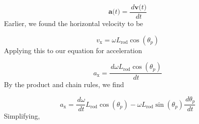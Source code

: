 \documentclass[12pt]{article}
\begin{document}
\begin{displaymath}
\symbf{a}\text{(}t\text{)}=\frac{\,d\symbf{v}\text{(}t\text{)}}{\,dt}
\end{displaymath}
Earlier, we found the horizontal velocity to be

\begin{displaymath}
{v_{\text{x}}}=ω {L_{\text{rod}}} \cos\left({θ_{p}}\right)
\end{displaymath}
Applying this to our equation for acceleration

\begin{displaymath}
{a_{\text{x}}}=\frac{\,dω {L_{\text{rod}}} \cos\left({θ_{p}}\right)}{\,dt}
\end{displaymath}
By the product and chain rules, we find

\begin{displaymath}
{a_{\text{x}}}=\frac{\,dω}{\,dt} {L_{\text{rod}}} \cos\left({θ_{p}}\right)-ω {L_{\text{rod}}} \sin\left({θ_{p}}\right) \frac{\,d{θ_{p}}}{\,dt}
\end{displaymath}
Simplifying,
\end{document}
